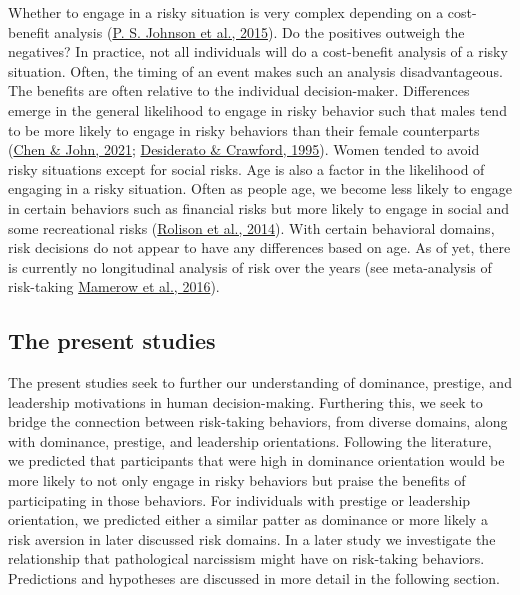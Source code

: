 \documentclass[
  donotrepeattitle,doc, 12pt, a4paper,floatsintext]{apa7}
\begin{document}
Whether to engage in a risky situation is very complex depending on a cost-benefit analysis (\protect\hyperlink{ref-johnson2015a}{P. S. Johnson et al., 2015}). Do the positives outweigh the negatives? In practice, not all individuals will do a cost-benefit analysis of a risky situation. Often, the timing of an event makes such an analysis disadvantageous. The benefits are often relative to the individual decision-maker. Differences emerge in the general likelihood to engage in risky behavior such that males tend to be more likely to engage in risky behaviors than their female counterparts (\protect\hyperlink{ref-chen2021}{Chen \& John, 2021}; \protect\hyperlink{ref-desiderato1995}{Desiderato \& Crawford, 1995}). Women tended to avoid risky situations except for social risks. Age is also a factor in the likelihood of engaging in a risky situation. Often as people age, we become less likely to engage in certain behaviors such as financial risks but more likely to engage in social and some recreational risks (\protect\hyperlink{ref-rolison2014}{Rolison et al., 2014}). With certain behavioral domains, risk decisions do not appear to have any differences based on age. As of yet, there is currently no longitudinal analysis of risk over the years (see meta-analysis of risk-taking \protect\hyperlink{ref-mamerow2016}{Mamerow et al., 2016}).

\hypertarget{the-present-studies}{%
\subsection{The present studies}\label{the-present-studies}}

The present studies seek to further our understanding of dominance, prestige, and leadership motivations in human decision-making. Furthering this, we seek to bridge the connection between risk-taking behaviors, from diverse domains, along with dominance, prestige, and leadership orientations. Following the literature, we predicted that participants that were high in dominance orientation would be more likely to not only engage in risky behaviors but praise the benefits of participating in those behaviors. For individuals with prestige or leadership orientation, we predicted either a similar patter as dominance or more likely a risk aversion in later discussed risk domains. In a later study we investigate the relationship that pathological narcissism might have on risk-taking behaviors. Predictions and hypotheses are discussed in more detail in the following section.
\end{document}
